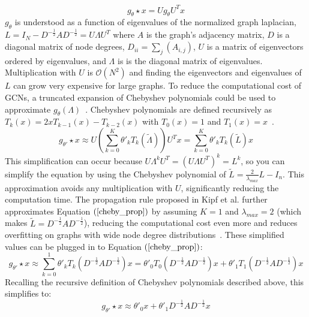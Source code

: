 \begin{equation}
\label{spectral_prop}
g_\theta \star x = Ug_\theta U^Tx
\end{equation}
$g_\theta$ is understood as a function of eigenvalues of the normalized graph laplacian, $L = I_N - D^{-\frac{1}{2}}AD^{-\frac{1}{2}} = U\Lambda U^T$ where $A$ is the graph's adjacency matrix, $D$ is a diagonal matrix of node degrees, $D_{ii} = \sum_{j} (A_{i,j})$, $U$ is a matrix of eigenvectors ordered by eigenvalues, and $\Lambda$ is is the diagonal matrix of eigenvalues. Multiplication with $U$ is $\mathcal{O}(N^2) $ and finding the eigenvectors and eigenvalues of $L$ can grow very expensive for large graphs. To reduce the computational cost of GCNs, a truncated expansion of Chebyshev polynomials could be used to approximate $g_\theta (\Lambda)$~\cite{Defferrard2016}.
Chebyshev polynomials are defined recursively as $T_k(x) = 2xT_{k-1}(x) - T_{k-2}(x)$ with $T_0(x) = 1$ and $T_1(x) = x$~\cite{Hammond2011}.
\begin{equation}
\label{cheby_prop}
g_{\theta'} \star x \approx U(\sum\limits_{k=0}^{K}\theta'_k T_k (\tilde{\Lambda}))U^Tx = \sum\limits_{k=0}^{K} \theta'_k T_k (\tilde{L})x
\end{equation}
This simplification can occur because $U \Lambda^k U^T = (U \Lambda U^T)^k = L^k $, so you can simplify the equation by using the Chebyshev polynomial of $\tilde{L} = \frac{2}{\lambda_{max}} L - I_n$. This approximation avoids any multiplication with $U$, significantly reducing the computation time. The propagation rule proposed in Kipf et al. further approximates Equation $(\ref{cheby_prop})$ by assuming $K = 1$ and $\lambda_{max} = 2$ (which makes $\tilde{L} = D^{-\frac{1}{2}}AD^{-\frac{1}{2}}$), reducing the computational cost even more and reduces overfitting on graphs with wide node degree distributions~\cite{Kipf2016}. These simplified values can be plugged in to Equation $(\ref{cheby_prop})$:
\begin{equation}
\label{reduce_k}
g_{\theta'} \star x \approx \sum\limits_{k=0}^{1} \theta'_k T_k (D^{-\frac{1}{2}}AD^{-\frac{1}{2}})x = \theta'_0 T_0(D^{-\frac{1}{2}}AD^{-\frac{1}{2}})x + \theta'_1 T_1(D^{-\frac{1}{2}}AD^{-\frac{1}{2}})x 
\end{equation}
Recalling the recursive definition of Chebyshev polynomials described above, this simplifies to:
\begin{equation}
\label{simplified_1stcheby}
g_{\theta'} \star x \approx \theta'_0x + \theta'_1 D^{-\frac{1}{2}}AD^{-\frac{1}{2}}x 
\end{equation}

